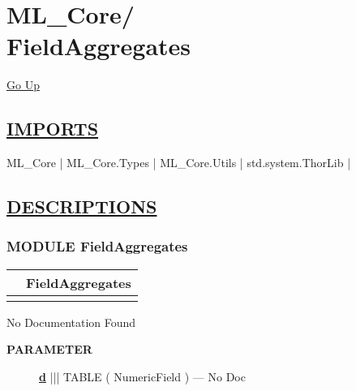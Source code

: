 \chapter*{\color{headfile}
{\large ML\_Core\slash\hspace{0pt}}
 \\
FieldAggregates
}
\hypertarget{ecldoc:toc:ML_Core.FieldAggregates}{}
\hyperlink{ecldoc:toc:root/ML_Core}{Go Up}

\section*{\underline{\textsf{IMPORTS}}}
\begin{doublespace}
{\large
ML\_Core |
ML\_Core.Types |
ML\_Core.Utils |
std.system.ThorLib |
}
\end{doublespace}

\section*{\underline{\textsf{DESCRIPTIONS}}}
\subsection*{\textsf{\colorbox{headtoc}{\color{white} MODULE}
FieldAggregates}}

\hypertarget{ecldoc:ml_core.fieldaggregates}{}

{\renewcommand{\arraystretch}{1.5}
\begin{tabularx}{\textwidth}{|>{\raggedright\arraybackslash}l|X|}
\hline
\hspace{0pt}\mytexttt{\color{red} } & \textbf{FieldAggregates} \\
\hline
\multicolumn{2}{|>{\raggedright\arraybackslash}X|}{\hspace{0pt}\mytexttt{\color{param} (DATASET(Types.NumericField) d)}} \\
\hline
\end{tabularx}
}

\par





No Documentation Found






\par
\begin{description}
\item [\colorbox{tagtype}{\color{white} \textbf{\textsf{PARAMETER}}}] \textbf{\underline{d}} ||| TABLE ( NumericField ) --- No Doc
\end{description}






